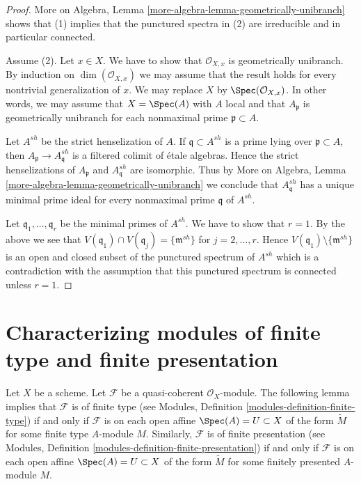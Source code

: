 \begin{proof}
More on Algebra, Lemma \ref{more-algebra-lemma-geometrically-unibranch}
shows that (1) implies that the punctured spectra in (2) are
irreducible and in particular connected.

\medskip\noindent
Assume (2). Let $x \in X$. We have to show that $\mathcal{O}_{X, x}$
is geometrically unibranch. By induction on $\dim(\mathcal{O}_{X, x})$
we may assume that the result holds for every nontrivial generalization of $x$.
We may replace $X$ by $\Spec(\mathcal{O}_{X, x})$. In other words,
we may assume that $X = \Spec(A)$ with $A$ local and that
$A_\mathfrak p$ is geometrically unibranch for each nonmaximal
prime $\mathfrak p \subset A$.

\medskip\noindent
Let $A^{sh}$ be the strict henselization of $A$. If
$\mathfrak q \subset A^{sh}$ is a prime lying over $\mathfrak p \subset A$,
then $A_\mathfrak p \to A^{sh}_\mathfrak q$ is a
filtered colimit of \'etale algebras. Hence the strict henselizations of
$A_\mathfrak p$ and $A^{sh}_\mathfrak q$ are isomorphic.
Thus by More on Algebra, Lemma \ref{more-algebra-lemma-geometrically-unibranch}
we conclude that $A^{sh}_\mathfrak q$
has a unique minimal prime ideal for every nonmaximal prime $\mathfrak q$ of
$A^{sh}$.

\medskip\noindent
Let $\mathfrak q_1, \ldots, \mathfrak q_r$ be the minimal primes
of $A^{sh}$. We have to show that $r = 1$. By the above
we see that $V(\mathfrak q_1) \cap V(\mathfrak q_j) = \{\mathfrak m^{sh}\}$
for $j = 2, \ldots, r$. Hence $V(\mathfrak q_1) \setminus \{\mathfrak m^{sh}\}$
is an open and closed subset of the punctured spectrum of $A^{sh}$
which is a contradiction with the assumption that this punctured spectrum
is connected unless $r = 1$.
\end{proof}





\section{Characterizing modules of finite type and finite presentation}
\label{section-characterizing-finite-type-presentation}

\noindent
Let $X$ be a scheme.
Let $\mathcal{F}$ be a quasi-coherent $\mathcal{O}_X$-module.
The following lemma implies that $\mathcal{F}$ is of finite type
(see Modules, Definition \ref{modules-definition-finite-type})
if and only if $\mathcal{F}$ is
on each open affine $\Spec(A) = U \subset X$
of the form $\widetilde M$ for some finite type $A$-module $M$.
Similarly, $\mathcal{F}$ is of finite presentation
(see Modules, Definition \ref{modules-definition-finite-presentation})
if and only if $\mathcal{F}$ is
on each open affine $\Spec(A) = U \subset X$
of the form $\widetilde M$ for some finitely presented $A$-module $M$.

